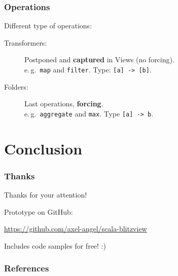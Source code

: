 \documentclass[12pt]{beamer}
\newcommand{\eg}{e.\,g.\ }
\begin{document}
\begin{frame}[fragile]
    \frametitle{Operations}
    Different type of operations:
    \begin{description}
        \item[Transformers:] Postponed and {\bf captured} in Views (no forcing). \\
            \eg \verb|map| and \verb|filter|.
            Type: \verb|[a] -> [b]|.
        \item[Folders:] Last operations, {\bf forcing}. \\
            \eg \verb|aggregate| and \verb|max|.
            Type \verb|[a] -> b|.
    \end{description}
\end{frame}

\section{Conclusion}
\begin{frame}
    \frametitle{Thanks}
    {\Huge Thanks for your attention!}

    Prototype on GitHub:

    \url{https://github.com/axel-angel/scala-blitzview}

    Includes code samples for free! :)
\end{frame}


\nocite{scala-bitrot}

\begin{frame}
    \frametitle<presentation>{References}
    
    
\end{frame}
\end{document}
